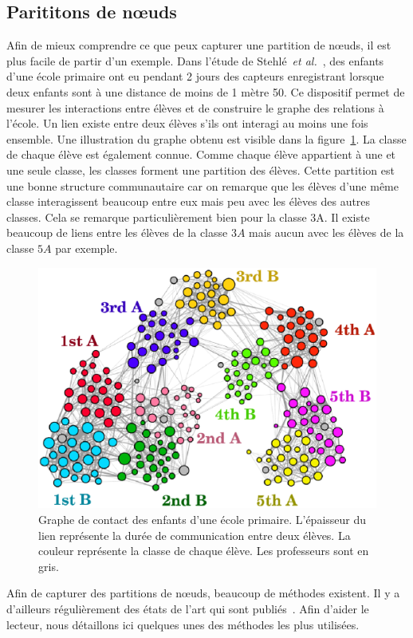 \subsection{Parititons de n\oe uds}
\label{subsec:Part_noeuds}
Afin de mieux comprendre ce que peux capturer une partition de n\oe uds, il est plus facile de partir d'un exemple.
Dans l'étude de Stehlé~\emph{et al.}~\cite{Stehle2011}, des enfants d'une école primaire ont eu pendant 2 jours des capteurs enregistrant lorsque deux enfants sont à une distance de moins de 1 mètre 50.
Ce dispositif permet de mesurer les interactions entre élèves et de construire le graphe des relations à l'école.
Un lien existe entre deux élèves s'ils ont interagi au moins une fois ensemble.
Une illustration du graphe obtenu est visible dans la figure~\ref{fig:ecole_primaire}.
La classe de chaque élève est également connue.
Comme chaque élève appartient à une et une seule classe, les classes forment une partition des élèves.
Cette partition est une bonne structure communautaire car on remarque que les élèves d'une même classe interagissent beaucoup entre eux mais peu avec les élèves des autres classes.
Cela se remarque particulièrement bien pour la classe 3A.
Il existe beaucoup de liens entre les élèves de la classe $3A$ mais aucun avec les élèves de la classe $5A$ par exemple.

\begin{figure}
\centering
\includegraphics[width=0.6\linewidth]{img/Intro/ecole_primaire}
\caption{Graphe de contact des enfants d'une école primaire. L'épaisseur du lien représente la durée de communication entre deux élèves. La couleur représente la classe de chaque élève. Les professeurs sont en gris.\protect\footnotemark}
\label{fig:ecole_primaire}
\end{figure}

Afin de capturer des partitions de n\oe uds, beaucoup de méthodes existent.
Il y a d'ailleurs régulièrement des états de l'art qui sont publiés~\cite{Fortunato2010,Plantie2013a, Malliaros2013a, Harenberg2014a}.
Afin d'aider le lecteur, nous détaillons ici quelques unes des méthodes les plus utilisées.

